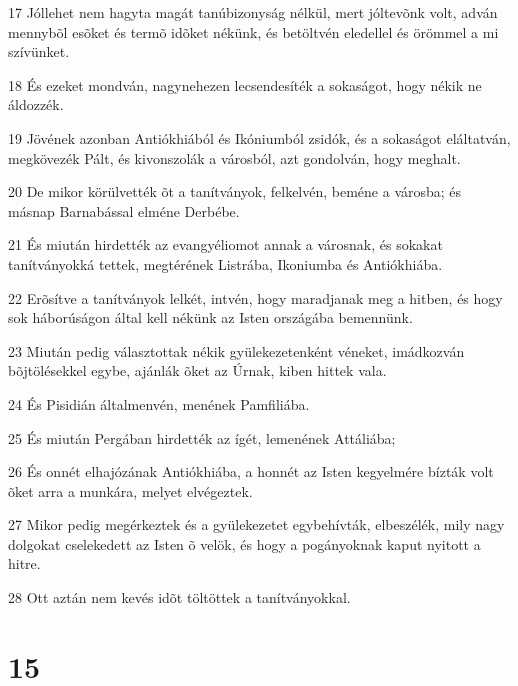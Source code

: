 \par 17 Jóllehet nem hagyta magát tanúbizonyság nélkül, mert jóltevõnk volt, adván mennybõl esõket és termõ idõket nékünk, és betöltvén eledellel és örömmel a mi szívünket.
\par 18 És ezeket mondván, nagynehezen lecsendesíték a sokaságot, hogy nékik ne áldozzék.
\par 19 Jövének azonban Antiókhiából és Ikóniumból zsidók, és a sokaságot eláltatván, megkövezék Pált, és kivonszolák a városból, azt gondolván, hogy meghalt.
\par 20 De mikor körülvették õt a tanítványok, felkelvén, beméne a városba; és másnap Barnabással elméne Derbébe.
\par 21 És miután hirdették az evangyéliomot annak a városnak, és sokakat tanítványokká tettek, megtérének Listrába, Ikoniumba és Antiókhiába.
\par 22 Erõsítve a tanítványok lelkét, intvén, hogy maradjanak meg a hitben, és hogy sok háborúságon által kell  nékünk az Isten országába bemennünk.
\par 23 Miután pedig választottak nékik gyülekezetenként véneket, imádkozván bõjtölésekkel  egybe, ajánlák õket az Úrnak, kiben hittek vala.
\par 24 És Pisidián általmenvén, menének Pamfiliába.
\par 25 És miután Pergában hirdették az ígét, lemenének Attáliába;
\par 26 És onnét elhajózának Antiókhiába, a honnét az Isten kegyelmére bízták volt õket arra a munkára, melyet elvégeztek.
\par 27 Mikor pedig megérkeztek és a gyülekezetet egybehívták, elbeszélék, mily nagy dolgokat cselekedett az Isten õ velök, és hogy a pogányoknak kaput nyitott a hitre.
\par 28 Ott aztán nem kevés idõt töltöttek a tanítványokkal.

\chapter{15}

